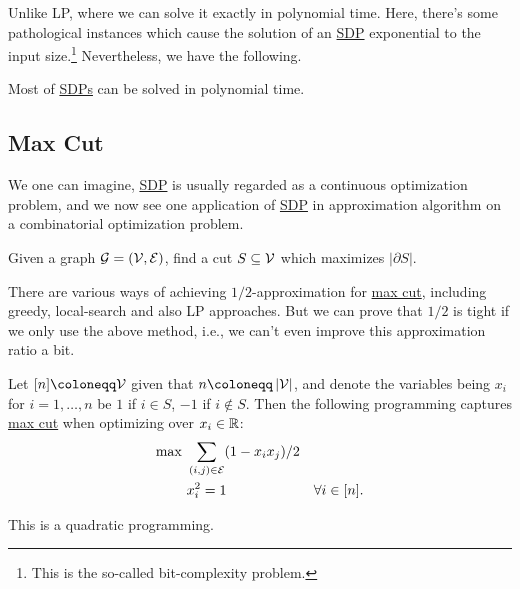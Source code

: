 Unlike LP, where we can solve it exactly in polynomial time. Here, there's some pathological instances which cause the solution of an \hyperref[def:SDP]{SDP} exponential to the input size.\footnote{This is the so-called bit-complexity problem.} Nevertheless, we have the following.

\begin{theorem}
	Most of \hyperref[def:SDP]{SDPs} can be solved in polynomial time.
\end{theorem}

\subsection{Max Cut}
We one can imagine, \hyperref[def:SDP]{SDP} is usually regarded as a continuous optimization problem, and we now see one application of \hyperref[def:SDP]{SDP} in approximation algorithm on a combinatorial optimization problem.

\begin{problem}\label{prb:max-cut}
Given a graph \(\mathcal{\MakeUppercase{g}} =(\mathcal{\MakeUppercase{v}} , \mathcal{\MakeUppercase{e}} )\), find a cut \(S\subseteq \mathcal{\MakeUppercase{v}} \) which maximizes \(\left\vert \partial S \right\vert \).
\end{problem}

\begin{remark}
	There are various ways of achieving \(1 / 2\)-approximation for \hyperref[prb:max-cut]{max cut}, including greedy, local-search and also LP approaches. But we can prove that \(1 / 2\) is tight if we only use the above method, i.e., we can't even improve this approximation ratio a bit.
\end{remark}

Let \([n] \coloneqq \mathcal{\MakeUppercase{v}} \) given that \(n \coloneqq \left\vert \mathcal{\MakeUppercase{v}}  \right\vert \), and denote the variables being \(x_i\) for \(i = 1, \ldots  , n\) be \(1\) if \(i\in S\), \(-1\) if \(i \notin S\). Then the following programming captures \hyperref[prb:max-cut]{max cut} when optimizing over \(x_i\in\mathbb{\MakeUppercase{r}} \):
\[
	\begin{aligned}
		\max~ & \sum_{(i, j)\in \mathcal{\MakeUppercase{e}}} ( 1 - x_i x_j) / 2                     \\
		      & x_i ^{2} = 1                                                    & \forall i\in [n].
	\end{aligned}
\]
\begin{remark}
	This is a quadratic programming.
\end{remark}


